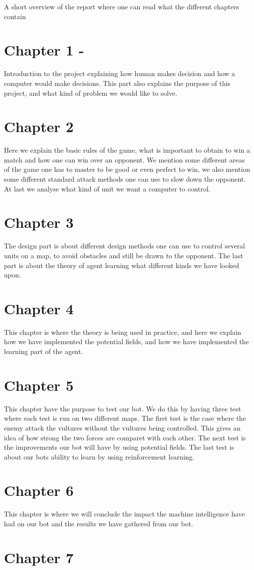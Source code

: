 A short overview of the report where one can read what the different chapters contain

\section*{Chapter 1 - }
Introduction to the project explaining how human makes decision and how a computer would make decisions. This part also explains the purpose of this project, and what kind of problem we would like to solve.
\section*{Chapter 2}
Here we explain the basic rules of the game, what is important to obtain to win a match and how one can win over an opponent. We mention some different areas of the game one has to master to be good or even perfect to win, we also mention some different standard attack methods one can use to slow down the opponent. At last we analyse what kind of unit we want a computer to control.
\section*{Chapter 3}
The design part is about different design methods one can use to control several units on a map, to avoid obstacles and still be drawn to the opponent. The last part is about the theory of agent learning what different kinds we have looked upon.
\section*{Chapter 4}
This chapter is where the theory is being used in practice, and here we explain how we have implemented the potential fields, and how we have implemented the learning part of the agent.
\section*{Chapter 5}
This chapter have the purpose to test our bot. We do this by having three test where each test is run on two different maps. The first test is the case
where the enemy attack the vultures without the vultures being controlled. This gives an idea of how strong the two forces are comparet with each other. The next test is the improvements our bot will have by using potential fields. The last test is about our bots ability to learn by using reinforcement learning.
\section*{Chapter 6}
This chapter is where we will conclude the impact the machine intelligence have had on our bot and the results we have gathered from our bot.
\section*{Chapter 7}